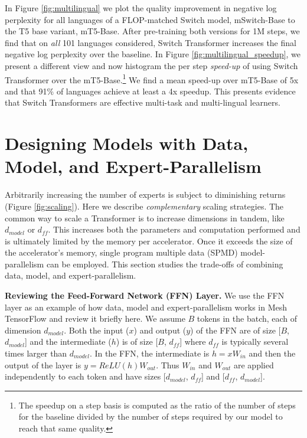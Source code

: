 \documentclass[twoside,11pt]{article}
\begin{document}
In Figure \ref{fig:multilingual} we plot the quality improvement in negative log perplexity for all languages of a FLOP-matched Switch model, mSwitch-Base to the T5 base variant, mT5-Base.
After pre-training both versions for 1M steps, we find that on \emph{all} 101 languages considered, Switch Transformer increases the final negative log perplexity over the baseline.
In Figure \ref{fig:multilingual_speedup}, we present a different view and now histogram the per step \emph{speed-up} of using Switch Transformer over the mT5-Base.\footnote{The speedup on a step basis is computed as the ratio of the number of steps for the baseline divided by the number of steps required by our model to reach that same quality.}
We find a mean speed-up over mT5-Base of 5x and that 91\% of languages achieve at least a 4x speedup.
This presents evidence that Switch Transformers are effective multi-task and multi-lingual learners.


\section{Designing Models with Data, Model, and Expert-Parallelism}
Arbitrarily increasing the number of experts is subject to diminishing returns (Figure \ref{fig:scaling}).
Here we describe \emph{complementary} scaling strategies.
The common way to scale a Transformer is to increase dimensions in tandem, like $d_{model}$ or $d_{ff}$.
This increases both the parameters and computation performed and is ultimately limited by the memory per accelerator.
Once it exceeds the size of the accelerator's memory, single program multiple data (SPMD) model-parallelism can be employed.
This section studies the trade-offs of combining data, model, and expert-parallelism.

\textbf{Reviewing the Feed-Forward Network (FFN) Layer.} 
We use the FFN layer as an example of how data, model and expert-parallelism works in Mesh TensorFlow \citep{shazeer2018mesh} and review it briefly here.
We assume $B$ tokens in the batch, each of dimension $d_{model}$.
Both the input ($x$) and output ($y$) of the FFN are of size [$B$, $d_{model}$] and the intermediate ($h$) is of size [$B$, $d_{ff}$] where $d_{ff}$ is typically several times larger than $d_{model}$.
In the FFN, the intermediate is $h=x W_{in}$ and then the output of the layer is $y = ReLU(h) W_{out}$.
Thus $W_{in}$ and $W_{out}$ are applied independently to each token and have sizes [$d_{model}$, $d_{ff}$] and [$d_{ff}$, $d_{model}$].
\end{document}
